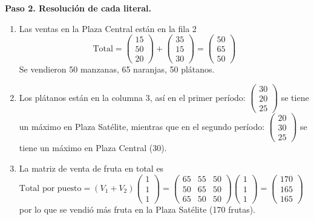 \begin{prob}
\begin{myproof}
\textbf{Paso 2. Resolución de cada literal.}

\begin{enumerate}[$(a)$]
\item Las ventas en la Plaza Central están en la fila 2
\[
\text{Total} = \begin{pmatrix} 15 \\ 50 \\ 20 \end{pmatrix} + \begin{pmatrix} 35 \\ 15 \\ 30 \end{pmatrix} = \boxed{\begin{pmatrix} 50 \\ 65 \\ 50 \end{pmatrix}}
\]
Se vendieron 50 manzanas, 65 naranjas, 50 plátanos.

\item Los plátanos están en la columna 3, así en el primer período: $\begin{pmatrix} 30 \\ 20 \\ 25 \end{pmatrix}$ se tiene un máximo en Plaza Satélite, mientras que en el segundo período: $\begin{pmatrix} 20 \\ 30 \\ 25 \end{pmatrix}$ se tiene un máximo en Plaza Central (30).

\item La matriz de venta de fruta en total es 
\(
\text{Total por puesto} = \left(V_1 + V_2\right) \begin{pmatrix} 1 \\ 1 \\ 1 \end{pmatrix} = \begin{pmatrix}
65 & 55 & 50 \\
50 & 65 & 50 \\
65 & 50 & 50
\end{pmatrix} \begin{pmatrix} 1 \\ 1 \\ 1 \end{pmatrix} = \begin{pmatrix} 170 \\ 165 \\ 165 \end{pmatrix}
\) por lo que se vendió más fruta en la Plaza Satélite (170 frutas).


\end{enumerate}
\end{myproof}
\end{prob}
